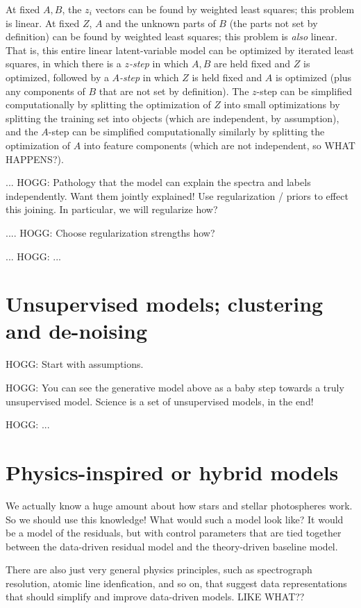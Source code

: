 \documentclass[modern]{aastex631}
\begin{document}
At fixed $A, B$, the $z_i$ vectors can be found by weighted least squares; this problem is linear.
At fixed $Z$, $A$ and the unknown parts of $B$ (the parts not set by definition) can be found by weighted least squares; this problem is \emph{also} linear.
That is, this entire linear latent-variable model can be optimized by iterated least squares, in which there is a \emph{$z$-step} in which $A, B$ are held fixed and $Z$ is optimized, followed by a \emph{$A$-step} in which $Z$ is held fixed and $A$ is optimized (plus any components of $B$ that are not set by definition).
The $z$-step can be simplified computationally by splitting the optimization of $Z$ into small optimizations by splitting the training set into objects (which are independent, by assumption), and the $A$-step can be simplified computationally similarly by splitting the optimization of $A$ into feature components (which are not independent, so WHAT HAPPENS?).

... HOGG: Pathology that the model can explain the spectra and labels independently. Want them jointly explained! Use regularization / priors to effect this joining. In particular, we will regularize how?

.... HOGG: Choose regularization strengths how?

... HOGG: ...

\section{Unsupervised models; clustering and de-noising}

HOGG: Start with assumptions.

HOGG: You can see the generative model above as a baby step towards a truly unsupervised model. Science is a set of unsupervised models, in the end!

HOGG: ...

\section{Physics-inspired or hybrid models}

We actually know a huge amount about how stars and stellar photospheres work.
So we should use this knowledge!
What would such a model look like?
It would be a model of the residuals, but with control parameters that are tied together between the data-driven residual model and the theory-driven baseline model.

There are also just very general physics principles, such as
spectrograph resolution, atomic line idenfication, and so on, that
suggest data representations that should simplify and improve
data-driven models. LIKE WHAT??
\end{document}

